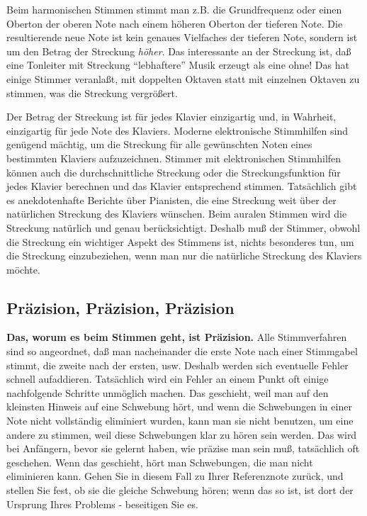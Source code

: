 Beim harmonischen Stimmen stimmt man z.B. die Grundfrequenz oder einen Oberton der oberen Note nach einem höheren Oberton der tieferen Note.
Die resultierende neue Note ist kein genaues Vielfaches der tieferen Note, sondern ist um den Betrag der Streckung \textit{höher}.
Das interessante an der Streckung ist, daß eine Tonleiter mit Streckung \enquote{lebhaftere} Musik erzeugt als eine ohne!
Das hat einige Stimmer veranlaßt, mit doppelten Oktaven statt mit einzelnen Oktaven zu stimmen, was die Streckung vergrößert.

Der Betrag der Streckung ist für jedes Klavier einzigartig und, in Wahrheit, einzigartig für jede Note des Klaviers.
Moderne elektronische Stimmhilfen sind genügend mächtig, um die Streckung für alle gewünschten Noten eines bestimmten Klaviers aufzuzeichnen.
Stimmer mit elektronischen Stimmhilfen können auch die durchschnittliche Streckung oder die Streckungsfunktion für jedes Klavier berechnen und das Klavier entsprechend stimmen.
Tatsächlich gibt es anekdotenhafte Berichte über Pianisten, die eine Streckung weit über der natürlichen Streckung des Klaviers wünschen.
Beim auralen Stimmen wird die Streckung natürlich und genau berücksichtigt.
Deshalb muß der Stimmer, obwohl die Streckung ein wichtiger Aspekt des Stimmens ist, nichts besonderes tun, um die Streckung einzubeziehen, wenn man nur die natürliche Streckung des Klaviers möchte.
 

\hypertarget{c2_5l}{}
\subsection{Präzision, Präzision, Präzision}\hypertarget{c2_5_prae}{} 

\textbf{Das, worum es beim Stimmen geht, ist Präzision.}
Alle Stimmverfahren sind so angeordnet, daß man nacheinander die erste Note nach einer Stimmgabel stimmt, die zweite nach der ersten, usw.
Deshalb werden sich eventuelle Fehler schnell aufaddieren.
Tatsächlich wird ein Fehler an einem Punkt oft einige nachfolgende Schritte unmöglich machen.
Das geschieht, weil man auf den kleinsten Hinweis auf eine Schwebung hört, und wenn die Schwebungen in einer Note nicht vollständig eliminiert wurden, kann man sie nicht benutzen, um eine andere zu stimmen, weil diese Schwebungen klar zu hören sein werden.
Das wird bei Anfängern, bevor sie gelernt haben, wie präzise man sein muß, tatsächlich oft geschehen.
Wenn das geschieht, hört man Schwebungen, die man nicht eliminieren kann.
Gehen Sie in diesem Fall zu Ihrer Referenznote zurück, und stellen Sie fest, ob sie die gleiche Schwebung hören; wenn das so ist, ist dort der Ursprung Ihres Problems - beseitigen Sie es.

